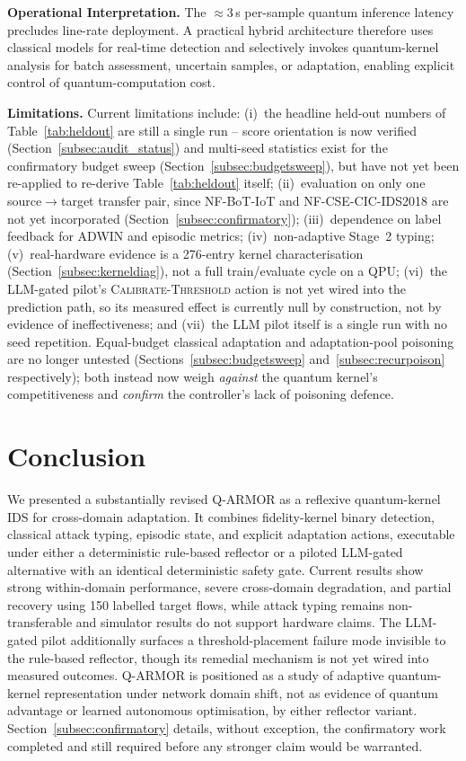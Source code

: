 \documentclass[conference]{IEEEtran}
\begin{document}
\textbf{Operational Interpretation.} The $\approx 3$\,s per-sample
quantum inference latency precludes line-rate deployment. A practical
hybrid architecture therefore uses classical models for real-time
detection and selectively invokes quantum-kernel analysis for batch
assessment, uncertain samples, or adaptation, enabling explicit control
of quantum-computation cost.

\textbf{Limitations.} Current limitations include: (i)~the headline
held-out numbers of Table~\ref{tab:heldout} are still a single run --
score orientation is now verified (Section~\ref{subsec:audit_status}) and
multi-seed statistics exist for the confirmatory budget sweep
(Section~\ref{subsec:budgetsweep}), but have not yet been re-applied to
re-derive Table~\ref{tab:heldout} itself; (ii)~evaluation on only one
source$\to$target transfer pair, since NF-BoT-IoT and
NF-CSE-CIC-IDS2018 are not yet incorporated
(Section~\ref{subsec:confirmatory}); (iii)~dependence on label feedback
for ADWIN and episodic metrics; (iv)~non-adaptive Stage~2 typing;
(v)~real-hardware evidence is a 276-entry kernel characterisation
(Section~\ref{subsec:kerneldiag}), not a full train/evaluate cycle on
a QPU; (vi)~the LLM-gated pilot's \textsc{Calibrate-Threshold} action
is not yet wired into the prediction path, so its measured effect is
currently null by construction, not by evidence of ineffectiveness; and
(vii)~the LLM pilot itself is a single run with no seed repetition.
Equal-budget classical adaptation and adaptation-pool poisoning are no
longer untested (Sections~\ref{subsec:budgetsweep}
and~\ref{subsec:recurpoison} respectively); both instead now weigh
\emph{against} the quantum kernel's competitiveness and \emph{confirm}
the controller's lack of poisoning defence.

\section{Conclusion}
\label{sec:conclusion}

We presented a substantially revised Q-ARMOR as a reflexive quantum-kernel
IDS for cross-domain adaptation. It combines fidelity-kernel binary
detection, classical attack typing, episodic state, and explicit
adaptation actions, executable under either a deterministic rule-based
reflector or a piloted LLM-gated alternative with an identical
deterministic safety gate. Current results show strong within-domain
performance, severe cross-domain degradation, and partial recovery using
150 labelled target flows, while attack typing remains non-transferable
and simulator results do not support hardware claims. The LLM-gated pilot
additionally surfaces a threshold-placement failure mode invisible to the
rule-based reflector, though its remedial mechanism is not yet wired into
measured outcomes. Q-ARMOR is positioned as a study of adaptive
quantum-kernel representation under network domain shift, not as evidence
of quantum advantage or learned autonomous optimisation, by either
reflector variant. Section~\ref{subsec:confirmatory} details, without
exception, the confirmatory work completed and still required before any
stronger claim would be warranted.
\end{document}
